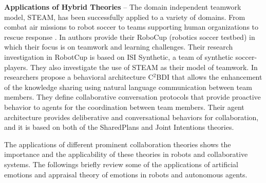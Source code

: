 \textbf{Applications of Hybrid Theories} -- The domain independent teamwork
model, STEAM, has been successfully applied to a variety of domains.  From
combat air missions \cite{hill:synthetic-battlefield-aircraft} to robot soccer
\cite{kitano:robocup} to teams supporting human organizations
\cite{pynadath:teamwork-heterogeneous-agents} to rescue response
\cite{scerri:robot-agent-person}. In \cite{marsella:robocup} authors provide
their RoboCup (robotics soccer testbed) in which their focus is on teamwork and
learning challenges. Their research investigation in RobotCup is based on ISI
Synthetic, a team of synthetic soccer-players. They also investigate the use of
STEAM as their model of teamwork. In \cite{kabil:coordination-mechanisms}
researchers propose a behavioral architecture C$^2$BDI that allows the
enhancement of the knowledge sharing using natural language communication
between team members. They define collaborative conversation protocols that
provide proactive behavior to agents for the coordination between team members.
Their agent architecture provides deliberative and conversational behaviors for
collaboration, and it is based on both of the SharedPlans and Joint Intentions
theories.

The applications of different prominent collaboration theories shows the
importance and the applicability of these theories in robots and collaborative
systems. The followings briefly review some of the applications of artificial
emotions and appraisal theory of emotions in robots and autonomous agents.\\

